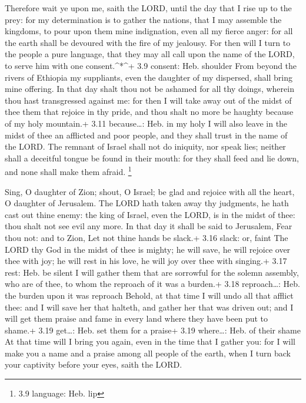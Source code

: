  Therefore wait ye upon me, saith the LORD, until the day
that I rise up to the prey: for my determination is to gather the
nations, that I may assemble the kingdoms, to pour upon them mine
indignation, even all my fierce anger: for all the earth shall be
devoured with the fire of my jealousy.  For then will I turn
to the people a pure language, that they may all call upon the name of
the LORD, to serve him with one consent.\^{}*\^{}+ 3.9 consent: Heb.
shoulder  From beyond the rivers of Ethiopia my suppliants,
even the daughter of my dispersed, shall bring mine offering.
 In that day shalt thou not be ashamed for all thy doings,
wherein thou hast transgressed against me: for then I will take away out
of the midst of thee them that rejoice in thy pride, and thou shalt no
more be haughty because of my holy mountain.+ 3.11 because\ldots: Heb.
in my holy  I will also leave in the midst of thee an
afflicted and poor people, and they shall trust in the name of the LORD.
 The remnant of Israel shall not do iniquity, nor speak
lies; neither shall a deceitful tongue be found in their mouth: for they
shall feed and lie down, and none shall make them afraid. \footnote{3.9
  language: Heb. lip}

 Sing, O daughter of Zion; shout, O Israel; be glad and
rejoice with all the heart, O daughter of Jerusalem.  The
LORD hath taken away thy judgments, he hath cast out thine enemy: the
king of Israel, even the LORD, is in the midst of thee: thou shalt not
see evil any more.  In that day it shall be said to
Jerusalem, Fear thou not: and to Zion, Let not thine hands be slack.+
3.16 slack: or, faint  The LORD thy God in the midst of
thee is mighty; he will save, he will rejoice over thee with joy; he
will rest in his love, he will joy over thee with singing.+ 3.17 rest:
Heb. be silent  I will gather them that are sorrowful for
the solemn assembly, who are of thee, to whom the reproach of it was a
burden.+ 3.18 reproach\ldots: Heb. the burden upon it was reproach
 Behold, at that time I will undo all that afflict thee:
and I will save her that halteth, and gather her that was driven out;
and I will get them praise and fame in every land where they have been
put to shame.+ 3.19 get\ldots: Heb. set them for a praise+ 3.19
where\ldots: Heb. of their shame  At that time will I bring
you again, even in the time that I gather you: for I will make you a
name and a praise among all people of the earth, when I turn back your
captivity before your eyes, saith the LORD.
